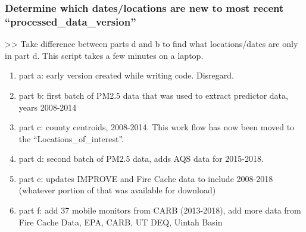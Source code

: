 \begin{enumerate}[nolistsep]



\end{enumerate}

\subsubsection{Determine which dates/locations are new to most recent ``processed\_data\_version'' }

 >> Take difference between parts d and b to find what locations/dates are only in part d. This script takes a few minutes on a laptop. 

\begin{enumerate}[nolistsep]
\item part a: early version created while writing code. Disregard.
\item part b: first batch of PM2.5 data that was used to extract predictor data, years 2008-2014
\item part c: county centroids, 2008-2014. This work flow has now been moved to the ``Locations\_of\_interest''.
\item part d: second batch of PM2.5 data, adds AQS data for 2015-2018.
\item part e: updates IMPROVE and Fire Cache data to include 2008-2018 (whatever portion of that was available for download)
\item part f: add 37 mobile monitors from CARB (2013-2018), add more data from Fire Cache Data, EPA, CARB, UT DEQ, Uintah Basin
\end{enumerate}

